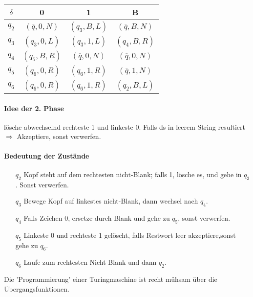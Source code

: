 \begin{table}[htb!]
\centering
\begin{tabular}{c|c c c}
$\delta$ & 0 & 1 & B \\
\hline
$q_2$ & $(\overline{q},0,N)$ & $(q_3,B,L)$ & $(\overline{q},B,N)$ \\
$q_3$ & $(q_3,0,L)$ & $(q_3,1,L)$ & $(q_4,B,R)$ \\
$q_4$ & $(q_5,B,R)$ & $(\overline{q},0,N)$ & $(\overline{q},0,N)$ \\
$q_5$ & $(q_6,0,R)$ & $(q_6,1,R)$ & $(\overline{q},1,N)$ \\
$q_6$ & $(q_6,0,R)$ & $(q_6,1,R)$ & $(q_2,B,L)$ \\
\end{tabular}
\end{table}

\paragraph*{Idee der 2. Phase} lösche abwechselnd rechteste 1 und linkeste 0. Falls ds in leerem String resultiert $\Rightarrow$ Akzeptiere, sonst verwerfen.

\paragraph*{Bedeutung der Zustände}
\begin{itemize}
	\item[$q_2$] Kopf steht auf dem rechtesten nicht-Blank; falls 1, lösche es, und gehe in $q_3$. Sonst verwerfen.
	\item[$q_3$] Bewege Kopf auf linkestes nicht-Blank, dann wechsel nach $q_4$.
	\item[$q_4$] Falls Zeichen 0, ersetze durch Blank und gehe zu $q_5$, sonst verwerfen.
	\item[$q_5$] Linkeste 0 und rechteste 1 gelöscht, falls Restwort leer akzeptiere,sonst gehe zu $q_6$.
	\item[$q_6$] Laufe zum rechtesten Nicht-Blank und dann $q_2$.
\end{itemize}

\par\medskip Die 'Programmierung' einer Turingmaschine ist recht mühsam über die Übergangsfunktionen.

